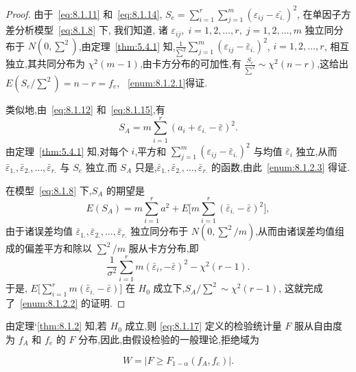 \begin{proof}
由于~\eqref{eq:8.1.11} 和~\eqref{eq:8.1.14}, $S_{e}=\sum\limits_{i=1}^{r} \sum\limits_{j=1}^{m}(\varepsilon_{i j}-\bar{\varepsilon_{i.}})^{2}$, 在单因子方差分析模型~\eqref{eq:8.1.8} 下, 我们知道, 诸 $\varepsilon_{ij}, \; i=1,2,\ldots,r,\; j=1,2,\ldots,m$ 独立同分布于 $N(0,\sum^2)$,由定理~\ref{thm:5.4.1} 知,$\tfrac{1}{\sum^2} \sum\limits_{j=1}^m (\varepsilon_{ij} - \bar{\varepsilon}_{i.})^2$, $i=1,2,\ldots,r$, 相互独立,其共同分布为 $\chi^2(m-1)$,由卡方分布的可加性,有 $\tfrac{S_e}{\sum^2} \sim \chi^2(n-r)$,这给出 $E(S_e/\sum^2) = n-r=f_e$, ~\ref{enum:8.1.2.1}得证.

类似地,由~\eqref{eq:8.1.12} 和~\eqref{eq:8.1.15},有
\begin{equation*}
  S_A =  m \sum_{i=1}^r (a_i + \varepsilon_{i.} - \bar{\varepsilon})^2.
\end{equation*}
由定理~\ref{thm:5.4.1} 知,对每个 $i$,平方和 $\sum\limits_{j=1}^m (\varepsilon_{ij} - \bar{\varepsilon}_{i.})^2$ 与均值 $\bar{\varepsilon}_{i}$ 独立,从而 $\bar{\varepsilon}_{1.}, \bar{\varepsilon}_{2.},\ldots,\bar{\varepsilon}_{r.}$ 与 $S_e$ 独立,而 $S_A$ 只是,$\bar{\varepsilon}_{1.}, \bar{\varepsilon}_{2.},\ldots,\bar{\varepsilon}_{r.}$ 的函数,由此~\ref{enum:8.1.2.3} 得证.

在模型~\ref{eq:8.1.8} 下,$S_A$ 的期望是
\begin{equation*}
  E(S_A) = m \sum_{i=1}^r a^2 + E\big[m\sum_{i=1}^r (\bar{\varepsilon}_{i.} - \bar{\varepsilon})^2\big],
\end{equation*}
由于诸误差均值 $\bar{\varepsilon}_{1.}, \bar{\varepsilon}_{2.},\ldots,\bar{\varepsilon}_{r.}$ 独立同分布于 $N(0, \sum^2/m)$,从而由诸误差均值组成的偏差平方和除以 $\sum^2/m$ 服从卡方分布,即
\begin{equation*}
  \frac{1}{\sigma^{2}} \sum_{i=1}^{r} m\left(\bar{\varepsilon}_{i},-\bar{\varepsilon}\right)^{2}-\chi^{2}(r-1).
\end{equation*}
于是, $E\big[\sum\limits_{i=1}^r m(\bar{\varepsilon}_{i.} - \bar{\varepsilon})\big]$ 在 $H_0$ 成立下,$S_A/\sum^2 \sim \chi^2(r-1)$, 这就完成了~\ref{enum:8.1.2.2} 的证明.
\end{proof}

由定理`\ref{thm:8.1.2} 知,若 $H_0$ 成立,则 \eqref{eq:8.1.17} 定义的检验统计量 $F$ 服从自由度为 $f_A$ 和 $f_e$ 的 $F$ 分布,因此,由假设检验的一般理论,拒绝域为

\begin{equation}\label{eq:8.1.18}
W =\left\lvert F \geq F_{1-\alpha}(f_{A}, f_{e}) \right\rvert .
\end{equation}

